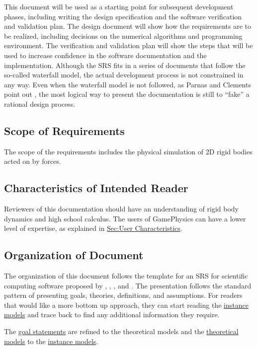 \documentclass[12pt]{article}
\begin{document}
This document will be used as a starting point for subsequent development phases, including writing the design specification and the software verification and validation plan. The design document will show how the requirements are to be realized, including decisions on the numerical algorithms and programming environment. The verification and validation plan will show the steps that will be used to increase confidence in the software documentation and the implementation. Although the SRS fits in a series of documents that follow the so-called waterfall model, the actual development process is not constrained in any way. Even when the waterfall model is not followed, as Parnas and Clements point out \cite{parnasClements1986}, the most logical way to present the documentation is still to ``fake'' a rational design process.

\subsection{Scope of Requirements}
\label{Sec:ReqsScope}
The scope of the requirements includes the physical simulation of 2D rigid bodies acted on by forces.

\subsection{Characteristics of Intended Reader}
\label{Sec:ReaderChars}
Reviewers of this documentation should have an understanding of rigid body dynamics and high school calculus. The users of GamePhysics can have a lower level of expertise, as explained in \hyperref[Sec:UserChars]{Sec:User Characteristics}.

\subsection{Organization of Document}
\label{Sec:DocOrg}
The organization of this document follows the template for an SRS for scientific computing software proposed by \cite{koothoor2013}, \cite{smithLai2005}, \cite{smithEtAl2007}, and \cite{smithKoothoor2016}. The presentation follows the standard pattern of presenting goals, theories, definitions, and assumptions. For readers that would like a more bottom up approach, they can start reading the \hyperref[Sec:IMs]{instance models} and trace back to find any additional information they require.

The \hyperref[Sec:GoalStmt]{goal statements} are refined to the theoretical models and the \hyperref[Sec:TMs]{theoretical models} to the \hyperref[Sec:IMs]{instance models}.
\end{document}
